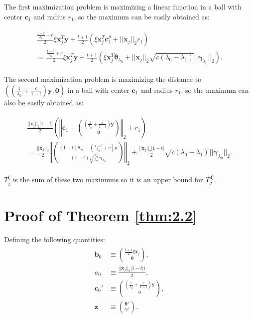 The first maximization problem is maximizing a linear function in a ball with center $\boldsymbol c_1$ and radius $r_1$, so the maximum can be easily obtained as:

\begin{gather}
    \begin{aligned}
        \frac{\frac{1-t}{\lambda_0}+c}{2}\xi\boldsymbol x_j^T \boldsymbol y+\frac{t+1}{2}\left(\xi \boldsymbol x_j^T \boldsymbol c_1^\theta+||\boldsymbol x_j||_2r_1\right)\\
        =\frac{\frac{1-t}{\lambda_0}+c}{2}\xi\boldsymbol x_j^T \boldsymbol y+\frac{t+1}{2}\left(\xi \boldsymbol x_j^T \boldsymbol \theta_{\lambda_0}+||\boldsymbol x_j||_2\sqrt{c(\lambda_0-\lambda_1)}||\boldsymbol\gamma_{\lambda_0}||_2\right).
    \end{aligned}
\end{gather}

The second maximization problem is maximizing the distance to $\left((\frac{1}{\lambda_0}+\frac{c}{1-t})\boldsymbol y,\boldsymbol 0\right)$ in a ball with center $\boldsymbol c_1$ and radius $r_1$, so the maximum can also be easily obtained as:

\begin{gather}
    \begin{aligned}
        \frac{||\boldsymbol x_j||_2|1-t|}{2}\left(\left\Vert\boldsymbol c_1-\binom{(\frac{1}{\lambda_0}+\frac{c}{1-t})\boldsymbol y}{\boldsymbol 0}\right\Vert_2+r_1\right)\\
        =\frac{||\boldsymbol x_j||_2}{2}\left\Vert\binom{(1-t)\theta_{\lambda_0}-\left(\frac{1-t}{\lambda_0}+c\right)\boldsymbol y}{(1-t)\sqrt{\frac{\lambda_1}{\lambda_0}}\boldsymbol\gamma_{\lambda_0}}\right\Vert_2+\frac{||\boldsymbol x_j||_2|1-t|}{2}\sqrt{c(\lambda_0-\lambda_1)}||\boldsymbol\gamma_{\lambda_0}||_2.
    \end{aligned}
\end{gather}

$T^\xi_j$ is the sum of these two maximums so it is an upper bound for $\Tilde{T}^\xi_j$.

\iffalse
\section{Proof of Theorem \ref{thm:2.2}}

Defining the following quantities:
\begin{gather}
    \begin{aligned}
        \boldsymbol b_0&\equiv\binom{\frac{t+1}{2}\xi \boldsymbol x_j}{\boldsymbol 0},\\
        a_0&\equiv\frac{||\boldsymbol x_j||_2|1-t|)}{2},\\
        \boldsymbol c_0'&\equiv\binom{\left(\frac{1}{\lambda_0}+\frac{c}{1-t}\right)\boldsymbol y}{0},\\
        \boldsymbol z &\equiv \binom{\boldsymbol\theta'}{\boldsymbol\gamma'}.
    \end{aligned}
\end{gather}

